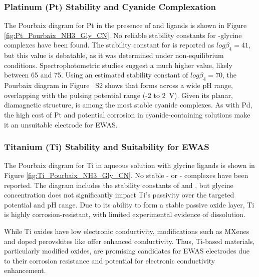 \documentclass[journal=jacsat,manuscript=article]{achemso}
\begin{document}
\subsubsection{Platinum (Pt) Stability and Cyanide Complexation} 
The Pourbaix diagram for Pt in the presence of  and  ligands is shown in Figure \ref{fig:Pt_Pourbaix_NH3_Gly_CN}. No reliable stability constants for -glycine complexes have been found\cite{Kiss1991CriticalGlycine}. The stability constant for \ce{[Pt(CN)4^2+]} is reported as $log\beta_4 = 41$\cite{Smith1989CriticalConstants}, but this value is debatable, as it was determined under non-equilibrium conditions\cite{Hancock1976FormationTetrakiscyanopalladate2-}. Spectrophotometric studies suggest a much higher value, likely between 65 and 75. Using an estimated stability constant of $log\beta_4 = 70$, the Pourbaix diagram in Figure ~S2 shows that \ce{[Pt(CN)4^2+]} forms across a wide pH range, overlapping with the pulsing potential range (-2 to 2~V). Given its planar, diamagnetic structure, \ce{[Pt(CN)4^2+]} is among the most stable cyanide complexes\cite{Griffith1962CyanideMetals}. As with Pd, the high cost of Pt and potential corrosion in cyanide-containing solutions make it an unsuitable electrode for EWAS.

\subsubsection{Titanium (Ti) Stability and Suitability for EWAS}
The Pourbaix diagram for Ti in aqueous solution with glycine ligands is shown in Figure \ref{fig:Ti_Pourbaix_NH3_Gly_CN}. No stable - or - complexes have been reported\cite{Griffith1962CyanideMetals, Nicholls1980ComplexTitanium}. The diagram includes the stability constants of \ce{[Ti(Gly)^-]} and \ce{[Ti(Gly)_2^+]}, but glycine concentration does not significantly impact Ti's passivity over the targeted potential and pH range. Due to its ability to form a stable passive oxide layer\cite{Kiss1991CriticalGlycine, PourbaixAtlasSolutions}, Ti is highly corrosion-resistant, with limited experimental evidence of dissolution\cite{Schmidt2009AqueousVoltammetry, Ziemniak1993SolubilityTemperatures, Knauss2001TiIV300C, Schmidt2006DissolutionEffect, Pocsi1988ComplexAcid}.

While Ti oxides have low electronic conductivity, modifications such as MXenes\cite{Gardon2013ImprovedSpray, Naguib2012Two-DimensionalCarbides, Hui2022VacancyBatteries} and doped perovskites like \cite{Sokolov2024ComputationalTitanate} offer enhanced conductivity. Thus, Ti-based materials, particularly modified oxides, are promising candidates for EWAS electrodes due to their corrosion resistance and potential for electronic conductivity enhancement.
\end{document}
